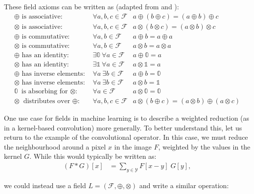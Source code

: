 \documentclass[a4paper, 12pt]{report}
\begin{document}
These field axioms can be written as (adapted from \cite{beachy2006abstract} and \cite{bellaardaxiomatic}):
\begin{align}
\textrm{$\oplus$ is associative: }&\forall a,b,c\in \mathcal{F} &  a \oplus (b \oplus c) = (a\oplus b) \oplus c \\ 
\textrm{$\otimes$ is associative: }&\forall a,b,c\in \mathcal{F} &  a \otimes (b \otimes c) = (a\otimes b) \otimes c \\ 
\textrm{$\oplus$ is commutative: }&\forall a,b\in \mathcal{F} & a\oplus b = a  \oplus a \\
\textrm{$\otimes$ is commutative: }&\forall a,b\in \mathcal{F} & a\otimes b = a  \otimes a \\
\oplus\textrm{ has an identity: }& \exists \mathbb{0} ~\forall a\in \mathcal{F} & a\oplus \mathbb{0} = a \\ 
\otimes\textrm{ has an identity: }& \exists \mathbb{1} ~\forall a\in \mathcal{F} & a\otimes \mathbb{1} = a \\ 
\oplus\textrm{ has inverse elements: }& \forall a~\exists b\in \mathcal{F} & a\oplus b = \mathbb{0} \label{eq:additive-inverse}  \\ 
\otimes\textrm{ has inverse elements: }& \forall a~\exists b\in \mathcal{F} & a\otimes b = \mathbb{1}  \\ 
\mathbb{0} \textrm{ is absorbing for $\otimes$: }&\forall a\in \mathcal{F} & a\otimes \mathbb{0} = \mathbb{0}\\
\otimes \textrm{ distributes over $\oplus$: }&\forall a,b,c\in \mathcal{F} & a\otimes (b \oplus c) = (a\otimes b)\oplus(a\otimes c)
\end{align}

One use case for fields in machine learning is to describe a weighted reduction (as in a kernel-based convolution) more generally. To better understand this, let us return to the example of the convolutional operator. In this case, we must reduce the neighbourhood around a pixel $x$ in the image $F$, weighted by the values in the kernel $G$. While this would typically be written as:
\begin{align}
	(F*G)[x] &= \sum_{y\in\mathcal{Y}} F[x-y]\; G[y],
\end{align}

\noindent
we could instead use a field $L=(\mathcal{F}, \oplus, \otimes)$ and write a similar operation:
\end{document}
